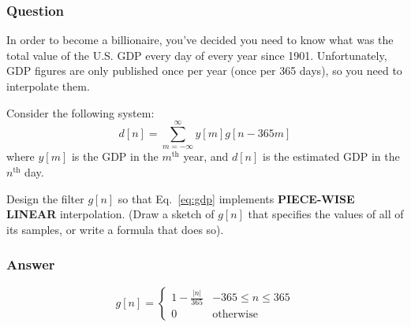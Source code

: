 \documentclass{beamer}
\begin{document}
\begin{frame}
  \frametitle{Question}
  In order to become a billionaire, you've decided you need to know what
  was the total value of the U.S. GDP every day of every year since
  1901.  Unfortunately, GDP figures are only published once per year
  (once per 365 days), so you need to interpolate them.
  
  Consider the following system: 
  \begin{equation}
    d[n] = \sum_{m=-\infty}^\infty y[m] g[n-365m]
    \label{eq:gdp}
  \end{equation}
  where $y[m]$ is the GDP in the $m^{\textrm{th}}$ year, and $d[n]$ is
  the estimated GDP in the $n^{\textrm{th}}$ day.
  
  Design the filter $g[n]$ so that Eq.~\ref{eq:gdp} implements {\bf
    PIECE-WISE LINEAR} interpolation.  (Draw a sketch of $g[n]$ that
  specifies the values of all of its samples, or write a formula that
  does so).
\end{frame}


\begin{frame}
  \frametitle{Answer}
  \[
  g[n] = \begin{cases}
    1 - \frac{|n|}{365} & -365\le n\le 365\\
    0 & \mbox{otherwise}
  \end{cases}
  \]
\end{frame}
\end{document}
